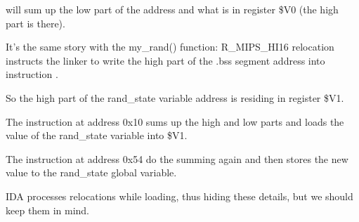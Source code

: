 \SW will sum up the low part of the address and what is in register \$V0 (the high part is there).

It's the same story with the my\_rand() function: R\_MIPS\_HI16 relocation instructs the linker to write the high part
of the .bss segment address into instruction \LUI.

So the high part of the rand\_state variable address is residing in register \$V1.

The \LW instruction at address 0x10 sums up the high and low parts and loads the value of the rand\_state 
variable into \$V1.

The \SW instruction at address 0x54 do the summing again and then stores the new value 
to the rand\_state global variable.

IDA processes relocations while loading, thus hiding these details, but we should keep them in mind.

